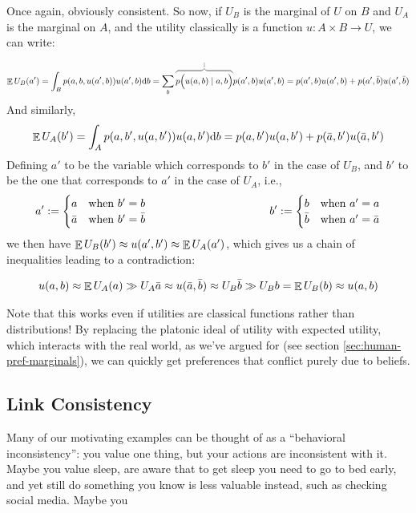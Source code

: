 \documentclass{article}
\begin{document}
	Once again, obviously consistent. So now, if $U_B$ is the marginal of $U$ on $B$ and $U_A$ is the marginal on $A$, and the utility classically is a function $u : A\times B \to U$, we can write:	
	
	\[ \E U_B(a') = \int_B p(a,b, u(a',b)) u(a',b) \mathrm d b = \sum_b  {\color{gray}\overbrace{\color{black} p\Big(u(a,b) \mid a,b\Big)}^{1}} p(a',b) u(a', b) = p(a', b) u(a', b) + p(a', \bar b) u(a', \bar b) \]
	And similarly,
	\[ \mathop{\mathbb E} U_A(b') = \int_A p(a,b', u(a,b')) u(a,b') \mathrm d b  = p(a,b') u(a, b') + p(\bar a, b') u(\bar a, b') \]
	Defining $a'$ to be the variable which corresponds to $b'$ in the case of $U_B$, and $b'$ to be the one that corresponds to $a'$ in the case of $U_A$, i.e.,
	\[
		a' := \begin{cases}
			a & \text{when } b' = b \\
			\bar a & \text{when } b' = \bar b
		\end{cases}
		\hspace{1.5in}
		b' := \begin{cases}
		b & \text{when } a' = a \\
		\bar b & \text{when } a' = \bar a
		\end{cases}		
	\]
	we then have $\mathop{\mathbb E} U_B (b') \approx u(a',b') \approx \mathop{\mathbb E} U_A(a')$, which gives us a chain of inequalities leading to a contradiction:
	
	\[ u(a,b) \approx \mathop{\mathbb E} U_A(a) \gg U_A \bar a \approx u(\bar a, \bar b) \approx U_B \bar b \gg U_B b = \mathop{\mathbb E} U_B(b) \approx u(a,b) \]
	
	Note that this works even if utilities are classical functions rather than distributions! By replacing the platonic ideal of utility with expected utility, which interacts with the real world, as we've argued for (see section \ref{sec:human-pref-marginals}), we can quickly get preferences that conflict purely due to beliefs.
	
	\subsection{Link Consistency}
	Many of our motivating examples can be thought of as a ``behavioral inconsistency'': you value one thing, but your actions are inconsistent with it. Maybe you value sleep, are aware that to get sleep you need to go to bed early, and yet still do something you know is less valuable instead, such as checking social media. Maybe you 
\end{document}

